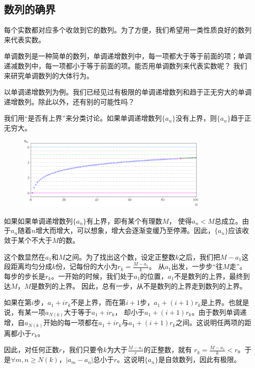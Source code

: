 \documentclass[12pt,UTF8]{ctexbook}
\begin{document}
\subsection{数列的确界}
每个实数都对应多个收敛到它的数列。为了方便，我们希望用一类性质良好的数列来代表实数。

单调数列是一种简单的数列，单调递增数列中，每一项都大于等于前面的项；单调递减数列中，每一项都小于等于前面的项。能否用单调数列来代表实数呢？
我们来研究单调数列的大体行为。

以单调递增数列为例。我们已经见过有极限的单调递增数列和趋于正无穷大的单调递增数列。除此以外，还有别的可能性吗？

我们用“是否有上界”来分类讨论。如果单调递增数列$\{a_n\}$没有上界，则$\{a_n\}$趋于正无穷大。

\begin{figure}[h]
    \vspace{-4pt}
    \centering
    \includegraphics[width=0.84\textwidth]{上确界1.png}
\end{figure}

如果如果单调递增数列$\{a_n\}$有上界，即有某个有理数$M$，
使得$a_n < M$总成立。由于$a_n$随着$n$增大而增大，可以想象，增大会逐渐变缓乃至停滞。因此，$\{a_n\}$应该收敛于某个不大于$M$的数。

这个数显然在$a_1$和$M$之间。为了找出这个数，设定正整数$k$之后，我们把$M - a_1$这段距离均匀分成$k$份，记每份的大小为$r_k = \frac{M - a_1}{k}$。
从$a_1$出发，一步步“往$M$走”。每步的步长是$r_k$。一开始的时候，我们处于$a_1$的位置，$a_1$不是数列的上界，最终到达$M$，$M$是数列的上界。
因此，总有一步，从不是数列的上界走到数列的上界。

如果在第$i$步，$a_1 + i r_k$不是上界，而在第$i+1$步，$a_1 + (i+1) r_k$是上界。也就是说，有某一项$a_{N(k)}$大于等于$a_1 + i r_k$，
却小于$a_1 + (i+1) r_k$。由于数列单调递增，自$a_{N(k)}$开始的每一项都在$a_1 + i r_k$与$a_1 + (i+1) r_k$之间。这说明任两项的距离都小于$r_k$。

因此，对任何正数$r$，我们只要令$k$为大于$\frac{M - a_1}{r}$的正整数，就有
$r_k = \frac{M - a_1}{k} < r$。于是$\forall m,n\geqslant N(k)$，$|a_m - a_n|$总小于$r$。这说明$\{a_n\}$是自敛数列，因此有极限。
\end{document}

